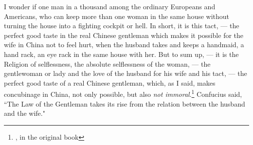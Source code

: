I wonder if one man in a thousand among the ordinary Europeans and Americans, who can keep more than one woman in the same house without turning the house into a fighting cockpit or hell.
In short, it is this tact, --- the perfect good taste in the real Chinese gentleman which makes it possible for the wife in China not to feel hurt, when the husband takes and keeps a handmaid, a hand rack, an eye rack in the same house with her.
But to sum up, --- it is the Religion of selflessness, the absolute selflessness of the woman, --- the gentlewoman or lady and the love of the husband for his wife and his tact, --- the perfect good taste of a real Chinese gentleman, which, as I said, makes concubinage in China, not only possible, but also \emph{not immoral}.\footnote{, in the original book} Confucius said, ``The Law of the Gentleman takes its rise from the relation between the husband and the wife."

